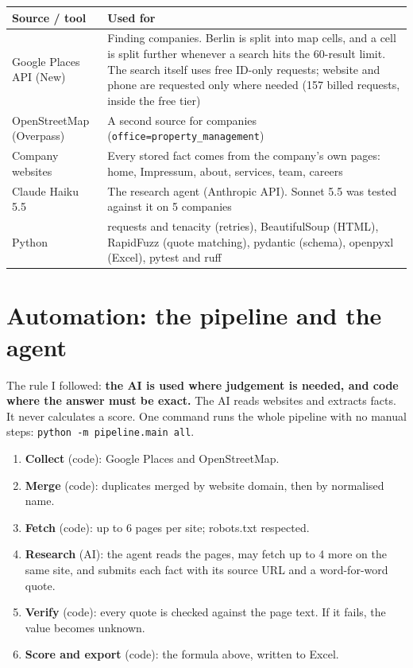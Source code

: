 \documentclass[11pt,a4paper]{article}
\newcommand{\code}[1]{\texttt{#1}}
\begin{document}
\begin{tabularx}{\linewidth}{@{}p{3.6cm} L@{}}
\toprule
\textbf{Source / tool} & \textbf{Used for} \\
\midrule
Google Places API (New) & Finding companies. Berlin is split into map cells, and a cell is
  split further whenever a search hits the 60-result limit. The search itself uses free ID-only
  requests; website and phone are requested only where needed (157 billed requests, inside the
  free tier) \\
OpenStreetMap (Overpass) & A second source for companies (\code{office=property\_management}) \\
Company websites & Every stored fact comes from the company's own pages: home, Impressum,
  about, services, team, careers \\
Claude Haiku 5.5 & The research agent (Anthropic API). Sonnet 5.5 was tested against it on
  5 companies \\
Python & requests and tenacity (retries), BeautifulSoup (HTML), RapidFuzz (quote matching),
  pydantic (schema), openpyxl (Excel), pytest and ruff \\
\bottomrule
\end{tabularx}

\section{Automation: the pipeline and the agent}

The rule I followed: \textbf{the AI is used where judgement is needed, and code where the answer
must be exact.} The AI reads websites and extracts facts. It never calculates a score. One
command runs the whole pipeline with no manual steps: \code{python -m pipeline.main all}.

\begin{enumerate}
  \item \textbf{Collect} (code): Google Places and OpenStreetMap.
  \item \textbf{Merge} (code): duplicates merged by website domain, then by normalised name.
  \item \textbf{Fetch} (code): up to 6 pages per site; robots.txt respected.
  \item \textbf{Research} (AI): the agent reads the pages, may fetch up to 4 more on the same
        site, and submits each fact with its source URL and a word-for-word quote.
  \item \textbf{Verify} (code): every quote is checked against the page text. If it fails, the
        value becomes unknown.
  \item \textbf{Score and export} (code): the formula above, written to Excel.
\end{enumerate}
\end{document}
